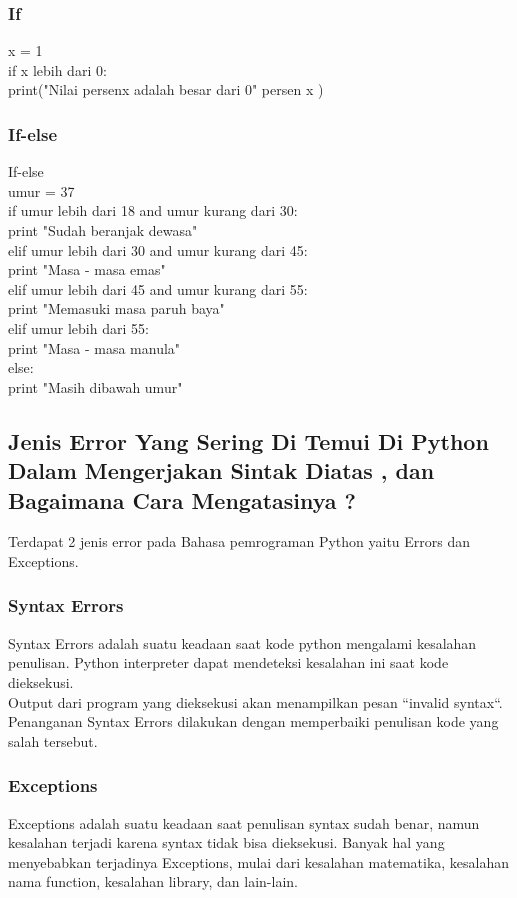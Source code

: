 \subsubsection{If}
x = 1\\
if x lebih dari 0:\\
	print("Nilai persenx adalah besar dari 0" persen x )
\subsubsection{If-else}
If-else\\
umur = 37\\
if umur lebih dari 18 and umur kurang dari 30:\\
    print "Sudah beranjak dewasa"\\
elif umur lebih dari 30 and umur kurang dari 45:\\
    print "Masa - masa emas"\\
elif umur lebih dari 45 and umur kurang dari 55:\\
    print "Memasuki masa paruh baya"\\
elif umur lebih dari 55:\\
    print "Masa - masa manula"\\
else:\\
    print "Masih dibawah umur"
    
\subsection{Jenis Error  Yang Sering Di Temui Di Python Dalam Mengerjakan Sintak Diatas , dan Bagaimana Cara Mengatasinya ?}

Terdapat 2 jenis error pada Bahasa pemrograman Python yaitu Errors dan Exceptions.
\subsubsection{Syntax Errors}
Syntax Errors adalah suatu keadaan saat kode python mengalami kesalahan penulisan. Python interpreter dapat mendeteksi kesalahan ini saat kode dieksekusi.\\
Output dari program yang dieksekusi akan menampilkan pesan “invalid syntax“. Penanganan Syntax Errors dilakukan dengan memperbaiki penulisan kode yang salah tersebut.
\subsubsection{ Exceptions}
Exceptions adalah suatu keadaan saat penulisan syntax sudah benar, namun kesalahan terjadi karena syntax tidak bisa dieksekusi. Banyak hal yang menyebabkan terjadinya Exceptions, mulai dari kesalahan matematika, kesalahan nama function, kesalahan library, dan lain-lain.\\

